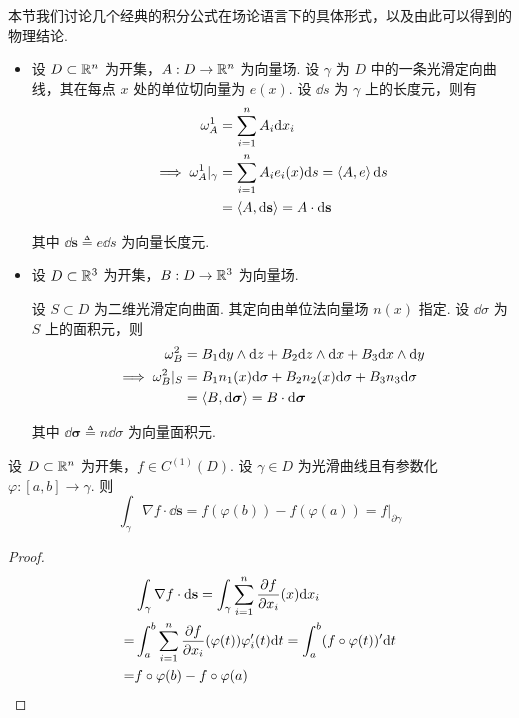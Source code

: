 本节我们讨论几个经典的积分公式在场论语言下的具体形式，以及由此可以得到的物理结论.



\begin{itemize}
    \item 设 $D\subset\mathbb{R}^n$ 为开集，$A:D\to\mathbb{R}^n$ 为向量场. 设 $\gamma$ 为 $D$ 中的一条光滑定向曲线，其在每点 $x$ 处的单位切向量为 $e(x)$. 设 $\dd s$ 为 $\gamma$ 上的长度元，则有
$$
\begin{aligned}
    \omega_A^1&=\sum_{i=1}^nA_i\mathrm{d} x_i\\
    \implies\omega_A^1|_\gamma&=\sum_{i=1}^nA_ie_i(x)\mathrm{d} s=\left\langle{A,e}\right\rangle\mathrm{d} s\\
    &=\left\langle{A,\mathrm{d}\mathbf{s}}\right\rangle=A\cdot\mathrm{d}\mathbf{s}
\end{aligned}
$$
    
    其中 $\dd\mathbf{s}\triangleq e\dd s$ 为向量长度元.

    \item 设 $D\subset\mathbb{R}^3$ 为开集，$B:D\to\mathbb{R}^3$ 为向量场.
    
    设 $S\subset D$ 为二维光滑定向曲面. 其定向由单位法向量场 $n(x)$ 指定. 设 $\dd\sigma$ 为 $S$ 上的面积元，则
$$
\begin{aligned}
    \omega_B^2&=B_1\mathrm{d} y\wedge\mathrm{d} z+B_2\mathrm{d} z\wedge\mathrm{d} x+B_3\mathrm{d} x\wedge\mathrm{d} y\\
    \implies\omega_B^2|_S&=B_1n_1(x)\mathrm{d}\sigma+B_2n_2(x)\mathrm{d}\sigma+B_3n_3\mathrm{d}\sigma\\
    &=\left\langle{B,\mathrm{d}\bm{\sigma}}\right\rangle=B\cdot\mathrm{d}\bm{\sigma}
\end{aligned}
$$

    其中 $\dd\bm{\sigma}\triangleq n\dd\sigma$ 为向量面积元.
\end{itemize}


\begin{theorem}  
    设 $D\subset\mathbb{R}^n$ 为开集，$f\in C^{(1)}(D)$. 设 $\gamma\in D$ 为光滑曲线且有参数化 $\varphi:[a,b]\to\gamma$. 则
$$
\int_\gamma\nabla f\cdot\dd\mathbf{s}=f(\varphi(b))-f(\varphi(a))=f|_{\partial\gamma}
$$
\end{theorem}
\begin{proof}
$$
\begin{aligned}
    &\int_\gamma\nabla f\cdot\mathrm{d}\mathbf{s}=\int_\gamma\sum_{i=1}^n\frac{\partial{f}}{\partial{x_i}}(x)\mathrm{d} x_i\\
    =&\int_a^b\sum_{i=1}^n\frac{\partial{f}}{\partial{x_i}}(\varphi(t))\varphi_i'(t)\mathrm{d} t=\int_a^b(f\circ\varphi(t))'\mathrm{d} t\\
    =&f\circ\varphi(b)-f\circ\varphi(a)
\end{aligned}
$$
\end{proof}

